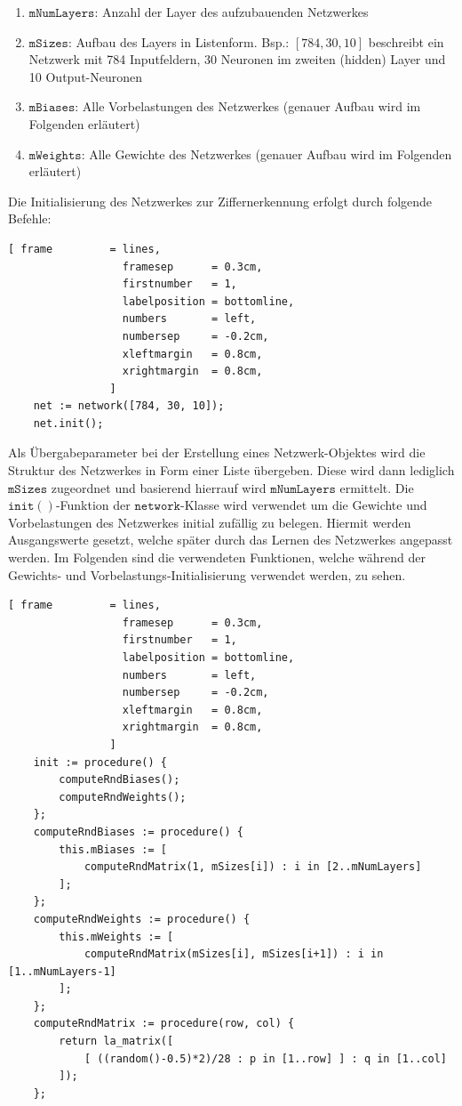 \begin{enumerate}
\item $\mathtt{mNumLayers}$: Anzahl der Layer des aufzubauenden Netzwerkes 
\item $\mathtt{mSizes}$: Aufbau des Layers in Listenform. Bsp.: $[784, 30, 10]$ beschreibt ein Netzwerk mit 784 Inputfeldern, 30 Neuronen im zweiten (hidden) Layer und 10 Output-Neuronen
\item $\mathtt{mBiases}$: Alle Vorbelastungen des Netzwerkes (genauer Aufbau wird im Folgenden erläutert)
\item $\mathtt{mWeights}$: Alle Gewichte des Netzwerkes (genauer Aufbau wird im Folgenden erläutert)
\end{enumerate}

\noindent
Die Initialisierung des Netzwerkes zur Ziffernerkennung erfolgt durch folgende Befehle:
\begin{Verbatim}[ frame         = lines, 
                  framesep      = 0.3cm, 
                  firstnumber   = 1,
                  labelposition = bottomline,
                  numbers       = left,
                  numbersep     = -0.2cm,
                  xleftmargin   = 0.8cm,
                  xrightmargin  = 0.8cm,
                ]
    net := network([784, 30, 10]);
    net.init();
\end{Verbatim}
Als Übergabeparameter bei der Erstellung eines Netzwerk-Objektes wird die Struktur des Netzwerkes in Form einer Liste übergeben. Diese wird dann lediglich $\mathtt{mSizes}$ zugeordnet und basierend hierrauf wird $\mathtt{mNumLayers}$ ermittelt.
Die $\mathtt{init()}$-Funktion der $\mathtt{network}$-Klasse wird verwendet um die Gewichte und Vorbelastungen des Netzwerkes initial zufällig zu belegen. Hiermit werden Ausgangswerte gesetzt, welche später durch das Lernen des Netzwerkes angepasst werden.
Im Folgenden sind die verwendeten Funktionen, welche während der Gewichts- und Vorbelastungs-Initialisierung verwendet werden, zu sehen.
\begin{Verbatim}[ frame         = lines, 
                  framesep      = 0.3cm, 
                  firstnumber   = 1,
                  labelposition = bottomline,
                  numbers       = left,
                  numbersep     = -0.2cm,
                  xleftmargin   = 0.8cm,
                  xrightmargin  = 0.8cm,
                ]
    init := procedure() {
        computeRndBiases();
        computeRndWeights();
    };
    computeRndBiases := procedure() {
        this.mBiases := [ 
            computeRndMatrix(1, mSizes[i]) : i in [2..mNumLayers] 
        ];
    };
    computeRndWeights := procedure() {
        this.mWeights := [ 
            computeRndMatrix(mSizes[i], mSizes[i+1]) : i in [1..mNumLayers-1] 
        ];
    };
    computeRndMatrix := procedure(row, col) {
        return la_matrix([
            [ ((random()-0.5)*2)/28 : p in [1..row] ] : q in [1..col]
        ]);
    };
\end{Verbatim}

